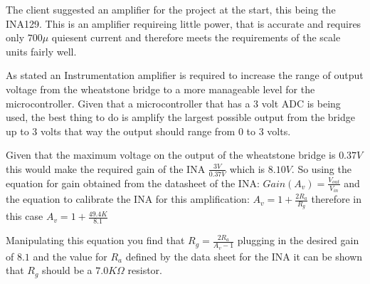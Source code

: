 The client suggested an amplifier for the project at the start, this being the INA129. This is an amplifier requireing little power, that is accurate and requires only $700\mu$ quiesent current and therefore meets the requirements of the scale units fairly well.

As stated an Instrumentation amplifier is required to increase the range of output voltage from the wheatstone bridge to a more manageable level for the microcontroller. Given that a microcontroller that has a $3$ volt ADC is being used, the best thing to do is amplify the largest possible output from the bridge up to $3$ volts that way the output should range from $0$ to $3$ volts. 

Given that the maximum voltage on the output of the wheatstone bridge is $0.37V$ this would make the required gain of the INA $\frac{3V}{0.37V}$ which is $8.10V$. So using the equation for gain obtained from the datasheet of the INA: \(Gain(A_{v}) = \frac{V_{out}}{V_{in}}\) and the equation to calibrate the INA for this amplification: 
$A_v = 1 + \frac{2R_a}{R_g}$ therefore in this case $A_v = 1 + \frac{49.4K}{8.1}$

Manipulating this equation you find that $R_g = \frac{2R_a}{A_v - 1}$ plugging in the desired gain of $8.1$ and the value for $R_a$ defined by the data sheet for the INA it can be shown that $R_g$ should be a $7.0K\Omega$ resistor. 